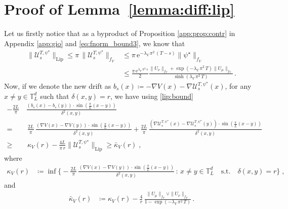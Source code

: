 \documentclass[final,12pt]{colt2023} %
\newcommand{\bes}{\begin{equation}}
\newcommand{\ees}{\end{equation}}
\newcommand{\rme}{\mathrm{e}}
\def\eqsp{\;}
\def\psistar{\psi^{\star}}
\begin{document}
\section{Proof of Lemma~\ref{lemma:diff:lip}}
\label{app:proof_lemm}

Let us firstly notice that as a byproduct of Proposition \ref{app:prop:contr} in Appendix \ref{app:gio} and \eqref{eq:fnorm_bound3},  we know that
\begin{align}\label{lip:bound}
  \|\mathcal{U}^{T,\psistar}_s\|_{\mathrm{Lip}}\leq \pi\,\|\mathcal{U}^{T,\psistar}_s\|_{f_V} &\leq \pi\,\rme^{-\lambda_V \,\pi^2\,(T-s)}\|\psistar\|_{f_V}
  \\
   &\leq \frac{\pi\,\rme^{\lambda_V \,\pi^2\,s}}{2}\frac{\|U_{\nu}\|_{f_V}+\exp(-\lambda_V \,\pi^2\,T)\|U_{\mu}\|_{f_V}}{\sinh(\lambda_V\,\pi^2\, T)}\,.
\end{align}
Now, if we denote the new drift as $b_s(x)\coloneqq -\nabla V(x)-\nabla \mathcal{U}^{T,\psistar}_s(x)$, for any $x\neq y\in\mathbb{T}_L^d$ such that $\delta(x,y)=r$, we have using \eqref{lip:bound}
\bes
\begin{split}
-\frac{2L}{\pi}\,&\frac{(b_s(x)-b_s(y))\cdot \sin(\frac{\pi}{L}(x-y))}{\delta^2(x,y)}\\
=&\,\frac{2L}{\pi}\,\frac{(\nabla V(x)-\nabla V(y))\cdot\sin(\frac{\pi}{L}(x-y))}{\delta^2(x,y)}+\frac{2L}{\pi}\,\frac{(\nabla \mathcal{U}^{T,\psistar}_s(x)-\nabla \mathcal{U}^{T,\psistar}_s(y))\cdot\sin(\frac{\pi}{L}(x-y))}{\delta^2(x,y)}\\
\geq&\, \kappa_V(r)-\frac{4L}{\pi\,r}\|\mathcal{U}^{T,\psistar}_s\|_{\mathrm{Lip}}\geq
\bar{\kappa}_V(r) \eqsp,
\end{split}
\ees
 where 
\begin{align}
    \kappa_V(r) &\coloneqq
\inf\biggl\{-\frac{2L}{\pi}\,\frac{(\nabla V (x)-\nabla V(y))\cdot \sin(\frac{\pi}{L}(x-y))}{\delta^2(x,y)}\,: \,x\neq y\in\mathbb{T}_L^d\quad \mathrm{s.t.}\quad\delta(x,y)=r
\biggr\} \eqsp,
\end{align}
and 
\begin{align}
\label{def:bar:kappa}\bar{\kappa}_V (r)&\coloneqq\kappa_V(r)-\frac4r\,\frac{\|U_{\mu}\|_{f_V}\vee\|U_{\nu}\|_{f_V}}{1-\exp(-\lambda_V \,\pi^2\,T)}\, . 
\end{align}
\end{document}
